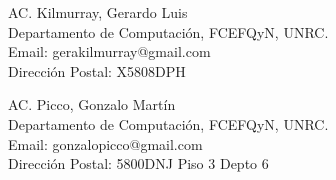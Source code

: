 \documentclass[%
 	final,
%
	notitlepage,
	narroweqnarray,
	inline,
 	twoside,
	]{ieee}
\begin{document}
\begin{thebibliography}{1}


\end{thebibliography}


\begin{biography}{AC. Kilmurray, Gerardo Luis}\\
Departamento de Computaci\'on, FCEFQyN, UNRC.\\
Email: gerakilmurray@gmail.com\\
Direcci\'on Postal: X5808DPH \\
\end{biography}


\begin{biography}{AC. Picco, Gonzalo Mart\'in}\\
Departamento de Computaci\'on, FCEFQyN, UNRC.\\
Email: gonzalopicco@gmail.com\\
Direcci\'on Postal: 5800DNJ Piso 3 Depto 6 \\
\end{biography}
\end{document}
